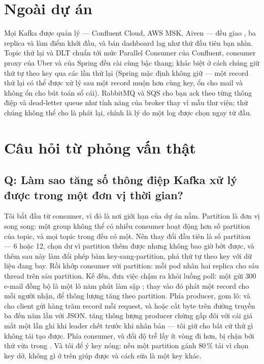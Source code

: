\section{Ngoài dự án}

Mọi Kafka được quản lý --- Confluent Cloud, AWS MSK, Aiven --- đều giao
, ba replica và  làm điểm
khởi đầu, và bán dashboard lag như thứ đầu tiên bạn nhìn. Topic thử lại
và DLT chuẩn tới mức Parallel Consumer của Confluent, consumer proxy
của Uber và  của Spring đều cài cùng bậc thang;
khác biệt ở cách chúng giữ thứ tự theo key qua các lần thử lại (Spring
mặc định không giữ --- một record thử lại có thể được xử lý sau một
record muộn hơn cùng key, ổn cho mail và không ổn cho bút toán sổ cái).
RabbitMQ và SQS cho bạn ack theo từng thông điệp và dead-letter queue
như tính năng của broker thay vì mẫu thư viện; thứ chúng không thể cho
là phát lại, chính là lý do một log được chọn ngay từ đầu.

\section{Câu hỏi từ phỏng vấn thật}

\subsection*{Q: Làm sao tăng số thông điệp Kafka xử lý được trong một đơn vị thời gian?}

Tôi bắt đầu từ consumer, vì đó là nơi giới hạn của dự án nằm. Partition
là đơn vị song song: một group không thể có nhiều consumer hoạt động
hơn số partition của topic, và mọi topic trong 
đều có một. Nên thay đổi đầu tiên là số partition --- 6 hoặc 12, chọn
dư vì partition thêm được nhưng không bao giờ bớt được, và thêm sau này
làm đổi phép băm key-sang-partition, phá thứ tự theo key với dữ liệu
đang bay. Rồi khớp consumer với partition:
 mỗi pod nhân hai replica cho
sáu thread trên sáu partition. Kế đến, đưa việc chậm ra khỏi luồng
poll: một  gửi 300 e-mail đồng bộ là một lô năm
phút làm sập ; thay vào đó phát một record
cho mỗi người nhận, để thông lượng tăng theo partition. Phía producer,
gom lô:  và  cho
client gửi hàng trăm record mỗi request, và 
hoặc  cắt byte trên đường truyền ba đến năm lần với JSON.
 tăng thông lượng producer chừng gấp đôi với cái giá mất
một lần ghi khi leader chết trước khi nhân bản --- tôi giữ
 cho bất cứ thứ gì không tái tạo được. Phía consumer,
 và  đổi độ trễ lấy ít vòng
đi hơn, bị chặn bởi thứ vừa trong . Và tôi để
ý key nóng: nếu một partition gánh 80\,\% tải vì chọn key dở, không gì ở
trên giúp được và cách sửa là một key khác.

